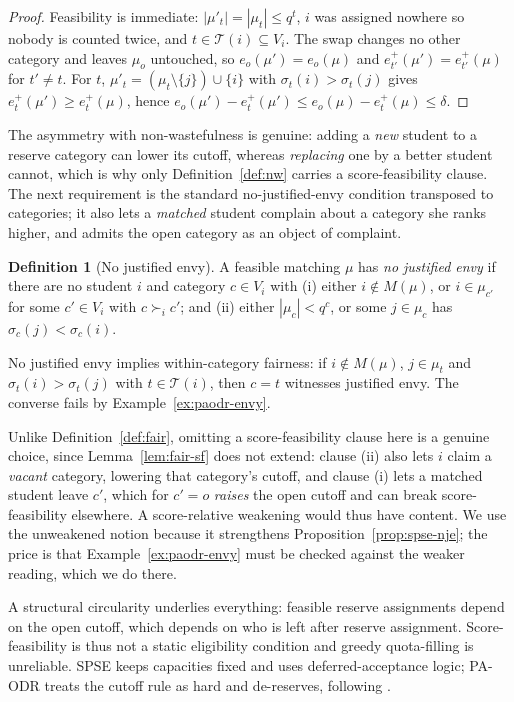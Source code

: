 \documentclass[a4paper,twoside]{article}
\theoremstyle{definition}
\newtheorem{definition}{Definition}
\renewcommand{\T}{\mathcal{T}}
\begin{document}
\begin{proof}
Feasibility is immediate: $|\mu'_t|=|\mu_t|\le q^t$, $i$ was assigned nowhere so nobody is counted twice, and $t\in\T(i)\subseteq V_i$. The swap changes no other category and leaves $\mu_o$ untouched, so $e_o(\mu')=e_o(\mu)$ and $e_{t'}^+(\mu')=e_{t'}^+(\mu)$ for $t'\neq t$. For $t$, $\mu'_t=(\mu_t\setminus\{j\})\cup\{i\}$ with $\sigma_t(i)>\sigma_t(j)$ gives $e_t^+(\mu')\ge e_t^+(\mu)$, hence $e_o(\mu')-e_t^+(\mu')\le e_o(\mu)-e_t^+(\mu)\le\delta$.
\end{proof}

The asymmetry with non-wastefulness is genuine: adding a \emph{new} student to a reserve category can lower its cutoff, whereas \emph{replacing} one by a better student cannot, which is why only Definition~\ref{def:nw} carries a score-feasibility clause. The next requirement is the standard no-justified-envy condition transposed to categories; it also lets a \emph{matched} student complain about a category she ranks higher, and admits the open category as an object of complaint.

\begin{definition}[No justified envy]
\label{def:nje}
A feasible matching $\mu$ has \emph{no justified envy} if there are no student $i$ and category $c\in V_i$ with (i) either $i\notin M(\mu)$, or $i\in\mu_{c'}$ for some $c'\in V_i$ with $c\succ_i c'$; and (ii) either $|\mu_c|<q^c$, or some $j\in\mu_c$ has $\sigma_c(j)<\sigma_c(i)$.
\end{definition}

No justified envy implies within-category fairness: if $i\notin M(\mu)$, $j\in\mu_t$ and $\sigma_t(i)>\sigma_t(j)$ with $t\in\T(i)$, then $c=t$ witnesses justified envy. The converse fails by Example~\ref{ex:paodr-envy}.

Unlike Definition~\ref{def:fair}, omitting a score-feasibility clause here is a genuine choice, since Lemma~\ref{lem:fair-sf} does not extend: clause (ii) also lets $i$ claim a \emph{vacant} category, lowering that category's cutoff, and clause (i) lets a matched student leave $c'$, which for $c'=o$ \emph{raises} the open cutoff and can break score-feasibility elsewhere. A score-relative weakening would thus have content. We use the unweakened notion because it strengthens Proposition~\ref{prop:spse-nje}; the price is that Example~\ref{ex:paodr-envy} must be checked against the weaker reading, which we do there.

A structural circularity underlies everything: feasible reserve assignments depend on the open cutoff, which depends on who is left after reserve assignment. Score-feasibility is thus not a static eligibility condition and greedy quota-filling is unreliable. SPSE keeps capacities fixed and uses deferred-acceptance logic; PA-ODR treats the cutoff rule as hard and de-reserves, following \cite{AyTu23a}.
\end{document}
